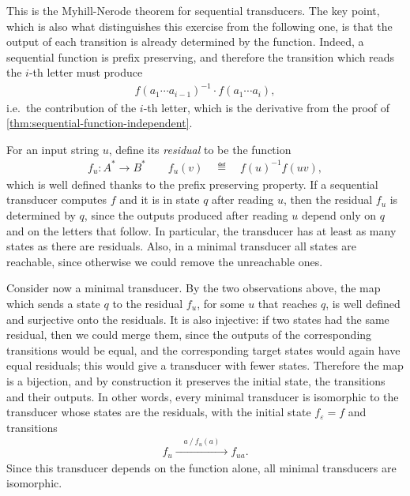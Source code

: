  {
    This is the Myhill-Nerode theorem for sequential transducers. The key point, which is also what distinguishes this exercise from the following one, is that the output of each transition is already determined by the function. Indeed, a sequential function is prefix preserving, and therefore the transition which reads the $i$-th letter must produce
    \begin{align*}
    f(a_1 \cdots a_{i-1})^{-1} \cdot f(a_1 \cdots a_i),
    \end{align*}
    i.e.~the contribution of the $i$-th letter, which is the derivative from the proof of \cref{thm:sequential-function-independent}.

    For an input string $u$, define its \emph{residual} to be the function
    \begin{align*}
    f_u : A^* \to B^* \qquad f_u(v) \quad \eqdef \quad f(u)^{-1} f(uv),
    \end{align*}
    which is well defined thanks to the prefix preserving property. If a sequential transducer computes $f$ and it is in state $q$ after reading $u$, then the residual $f_u$ is determined by $q$, since the outputs produced after reading $u$ depend only on $q$ and on the letters that follow. In particular, the transducer has at least as many states as there are residuals. Also, in a minimal transducer all states are reachable, since otherwise we could remove the unreachable ones.

    Consider now a minimal transducer. By the two observations above, the map which sends a state $q$ to the residual $f_u$, for some $u$ that reaches $q$, is well defined and surjective onto the residuals. It is also injective: if two states had the same residual, then we could merge them, since the outputs of the corresponding transitions would be equal, and the corresponding target states would again have equal residuals; this would give a transducer with fewer states. Therefore the map is a bijection, and by construction it preserves the initial state, the transitions and their outputs. In other words, every minimal transducer is isomorphic to the transducer whose states are the residuals, with the initial state $f_\varepsilon = f$ and transitions
    \begin{align*}
    f_u \xrightarrow{\quad a \ / \ f_u(a) \quad} f_{ua}.
    \end{align*}
    Since this transducer depends on the function alone, all minimal transducers are isomorphic.
}

